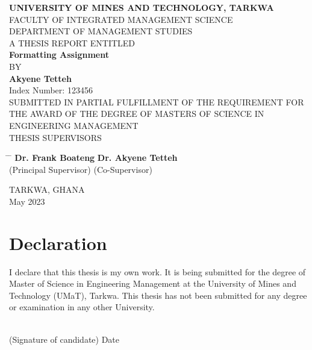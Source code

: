 \documentclass[12pt,a4paper]{report}
\begin{document}
	\begin{titlepage}
		\centering
		\vspace*{1in}
		{\LARGE \bfseries UNIVERSITY OF MINES AND TECHNOLOGY, TARKWA \\}
		\vspace{0.5in}
		{\Large FACULTY OF INTEGRATED MANAGEMENT SCIENCE \\}
		\vspace{0.5in}
		{\Large DEPARTMENT OF MANAGEMENT STUDIES \\}
		\vspace{1.5in}
		{\Large A THESIS REPORT ENTITLED \\}
		\vspace{0.5in}
		{\LARGE \bfseries Formatting Assignment \\}
		\vspace{0.5in}
		{\Large BY \\}
		\vspace{0.5in}
		{\LARGE \bfseries Akyene Tetteh \\}
		\vspace{0.5in}
		{\Large Index Number: 123456 \\}
		\vfill
		{\Large SUBMITTED IN PARTIAL FULFILLMENT OF THE REQUIREMENT FOR THE AWARD OF THE DEGREE OF MASTERS OF SCIENCE IN ENGINEERING MANAGEMENT \\}
		\vfill
		{\Large THESIS SUPERVISORS \\}
		\vspace{0.3in}
		\begin{tabbing}
			\hspace{2in} \= \hspace{3in} \= \kill
			\large \textbf{Dr. Frank Boateng} \> \large \textbf{Dr. Akyene Tetteh} \\
			\large (Principal Supervisor) \> \large (Co-Supervisor)
		\end{tabbing}
		\vfill
		{\Large TARKWA, GHANA \\}
		\vspace{0.5in}
		{\Large May 2023 \\}
	\end{titlepage}

	\chapter*{Declaration}
	I declare that this thesis is my own work. It is being submitted for the degree of Master of Science in Engineering Management at the University of Mines and Technology (UMaT), Tarkwa. This thesis has not been submitted for any degree or examination in any other University. \\
	\vspace{1in}
	\begin{flushleft}
		\makebox[2.5in]{\hrulefill} \hfill \makebox[1.5in]{\hrulefill} \\
		(Signature of candidate) \hfill Date
	\end{flushleft}
\end{document}
